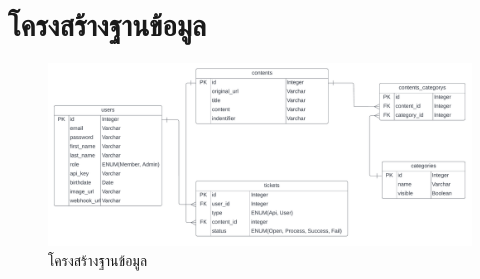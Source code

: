 \documentclass[12pt,oneside,openright,a4paper]{cpe-thai-project}
\begin{document}
\section{โครงสร้างฐานข้อมูล}
\begin{figure}[!ht]\centering
  \includegraphics[width=\textwidth]{./img/database.png}
  \caption{โครงสร้างฐานข้อมูล}\label{fig:database} 
\end{figure}
\end{document}

